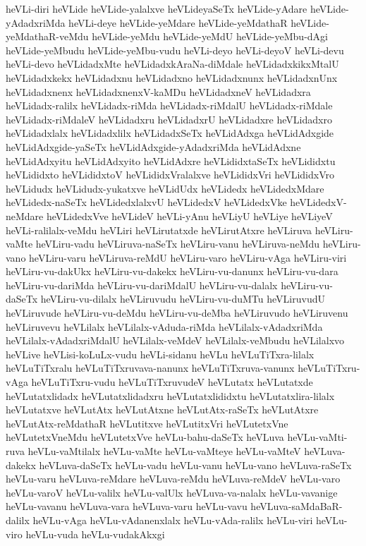 {heVLi-diri
heVLide
heVLide-yalalxve
heVLideyaSeTx
heVLide-yAdare
heVLide-yAdadxriMda
heVLi-deye
heVLide-yeMdare
heVLide-yeMdathaR
heVLide-yeMdathaR-veMdu
heVLide-yeMdu
heVLide-yeMdU
heVLide-yeMbu-dAgi
heVLide-yeMbudu
heVLide-yeMbu-vudu
heVLi-deyo
heVLi-deyoV
heVLi-devu
heVLi-devo
heVLidadxMte
heVLidadxkAraNa-diMdale
heVLidadxkikxMtalU
heVLidadxkekx
heVLidadxnu
heVLidadxno
heVLidadxnunx
heVLidadxnUnx
heVLidadxnenx
heVLidadxnenxV-kaMDu
heVLidadxneV
heVLidadxra
heVLidadx-ralilx
heVLidadx-riMda
heVLidadx-riMdalU
heVLidadx-riMdale
heVLidadx-riMdaleV
heVLidadxru
heVLidadxrU
heVLidadxre
heVLidadxro
heVLidadxlalx
heVLidadxlilx
heVLidadxSeTx
heVLidAdxga
heVLidAdxgide
heVLidAdxgide-yaSeTx
heVLidAdxgide-yAdadxriMda
heVLidAdxne
heVLidAdxyitu
heVLidAdxyito
heVLidAdxre
heVLididxtaSeTx
heVLididxtu
heVLididxto
heVLididxtoV
heVLididxVralalxve
heVLididxVri
heVLididxVro
heVLidudx
heVLidudx-yukatxve
heVLidUdx
heVLidedx
heVLidedxMdare
heVLidedx-naSeTx
heVLidedxlalxvU
heVLidedxV
heVLidedxVke
heVLidedxV-neMdare
heVLidedxVve
heVLideV
heVLi-yAnu
heVLiyU
heVLiye
heVLiyeV
heVLi-ralilalx-veMdu
heVLiri
heVLirutatxde
heVLirutAtxre
heVLiruva
heVLiru-vaMte
heVLiru-vadu
heVLiruva-naSeTx
heVLiru-vanu
heVLiruva-neMdu
heVLiru-vano
heVLiru-varu
heVLiruva-reMdU
heVLiru-varo
heVLiru-vAga
heVLiru-viri
heVLiru-vu-dakUkx
heVLiru-vu-dakekx
heVLiru-vu-danunx
heVLiru-vu-dara
heVLiru-vu-dariMda
heVLiru-vu-dariMdalU
heVLiru-vu-dalalx
heVLiru-vu-daSeTx
heVLiru-vu-dilalx
heVLiruvudu
heVLiru-vu-duMTu
heVLiruvudU
heVLiruvude
heVLiru-vu-deMdu
heVLiru-vu-deMba
heVLiruvudo
heVLiruvenu
heVLiruvevu
heVLilalx
heVLilalx-vAduda-riMda
heVLilalx-vAdadxriMda
heVLilalx-vAdadxriMdalU
heVLilalx-veMdeV
heVLilalx-veMbudu
heVLilalxvo
heVLive
heVLisi-koLuLx-vudu
heVLi-sidanu
heVLu
heVLuTiTxra-lilalx
heVLuTiTxralu
heVLuTiTxruvava-nanunx
heVLuTiTxruva-vanunx
heVLuTiTxru-vAga
heVLuTiTxru-vudu
heVLuTiTxruvudeV
heVLutatx
heVLutatxde
heVLutatxlidadx
heVLutatxlidadxru
heVLutatxlididxtu
heVLutatxlira-lilalx
heVLutatxve
heVLutAtx
heVLutAtxne
heVLutAtx-raSeTx
heVLutAtxre
heVLutAtx-reMdathaR
heVLutitxve
heVLutitxVri
heVLutetxVne
heVLutetxVneMdu
heVLutetxVve
heVLu-bahu-daSeTx
heVLuva
heVLu-vaMti-ruva
heVLu-vaMtilalx
heVLu-vaMte
heVLu-vaMteye
heVLu-vaMteV
heVLuva-dakekx
heVLuva-daSeTx
heVLu-vadu
heVLu-vanu
heVLu-vano
heVLuva-raSeTx
heVLu-varu
heVLuva-reMdare
heVLuva-reMdu
heVLuva-reMdeV
heVLu-varo
heVLu-varoV
heVLu-valilx
heVLu-valUlx
heVLuva-va-nalalx
heVLu-vavanige
heVLu-vavanu
heVLuva-vara
heVLuva-varu
heVLu-vavu
heVLuva-saMdaBaR-dalilx
heVLu-vAga
heVLu-vAdanenxlalx
heVLu-vAda-ralilx
heVLu-viri
heVLu-viro
heVLu-vuda
heVLu-vudakAkxgi
}
